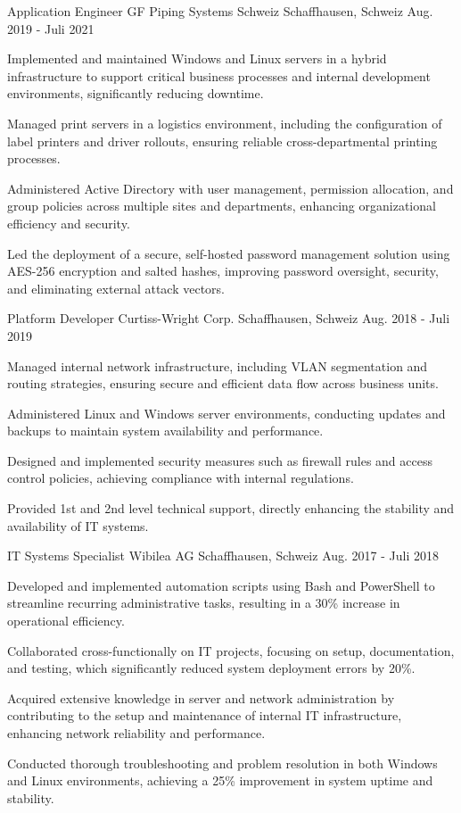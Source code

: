 \begin{cventries}
\cventry
  {Application Engineer}
  {GF Piping Systems Schweiz}
  {Schaffhausen, Schweiz}
  {Aug. 2019 - Juli 2021}
  {
    \begin{cvitems}
\item {Implemented and maintained Windows and Linux servers in a hybrid infrastructure to support critical business processes and internal development environments, significantly reducing downtime.}
\item {Managed print servers in a logistics environment, including the configuration of label printers and driver rollouts, ensuring reliable cross-departmental printing processes.}
\item {Administered Active Directory with user management, permission allocation, and group policies across multiple sites and departments, enhancing organizational efficiency and security.}
\item {Led the deployment of a secure, self-hosted password management solution using AES-256 encryption and salted hashes, improving password oversight, security, and eliminating external attack vectors.}
\end{cvitems}
  }

\cventry
  {Platform Developer}
  {Curtiss-Wright Corp.}
  {Schaffhausen, Schweiz}
  {Aug. 2018 - Juli 2019}
  {
    \begin{cvitems}
\item {Managed internal network infrastructure, including VLAN segmentation and routing strategies, ensuring secure and efficient data flow across business units.}
\item {Administered Linux and Windows server environments, conducting updates and backups to maintain system availability and performance.}
\item {Designed and implemented security measures such as firewall rules and access control policies, achieving compliance with internal regulations.}
\item {Provided 1st and 2nd level technical support, directly enhancing the stability and availability of IT systems.}
\end{cvitems}
  }

\cventry
  {IT Systems Specialist}
  {Wibilea AG}
  {Schaffhausen, Schweiz}
  {Aug. 2017 - Juli 2018}
  {
    \begin{cvitems}
\item {Developed and implemented automation scripts using Bash and PowerShell to streamline recurring administrative tasks, resulting in a 30\% increase in operational efficiency.}
\item {Collaborated cross-functionally on IT projects, focusing on setup, documentation, and testing, which significantly reduced system deployment errors by 20\%.}
\item {Acquired extensive knowledge in server and network administration by contributing to the setup and maintenance of internal IT infrastructure, enhancing network reliability and performance.}
\item {Conducted thorough troubleshooting and problem resolution in both Windows and Linux environments, achieving a 25\% improvement in system uptime and stability.}
\end{cvitems}
  }
\end{cventries}
